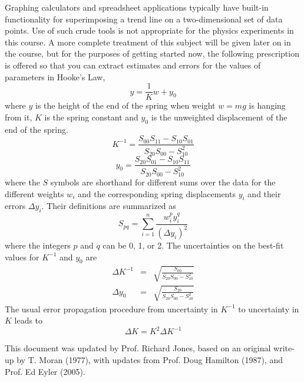 \documentclass{revtex4}
\begin{document}
Graphing calculators and spreadsheet applications typically have
built-in functionality for superimposing a trend line on a 
two-dimensional set of data points.  Use of such crude tools is not
appropriate for the physics experiments in this course.  A more complete
treatment of this subject will be given later on in the course, but for
the purposes of getting started now, the following prescription is offered
so that you can extract estimates and errors for the values of parameters
in Hooke's Law,
\begin{equation}
y = \frac{1}{K}w + y_0
\end{equation}
where $y$ is the height of the end of the spring when weight $w=mg$ is
hanging from it, $K$ is the spring constant and $y_0$ is the unweighted
displacement of the end of the spring.
\begin{equation}
K^{-1} = \frac{S_{00}S_{11}-S_{10}S_{01}}{S_{20}S_{00}-S_{10}^2}
\end{equation}
\begin{equation}
y_0 = \frac{S_{20}S_{01}-S_{10}S_{11}}{S_{20}S_{00}-S_{10}^2}
\end{equation}
where the $S$ symbols are shorthand for different sums over the data
for the different weights $w_i$ and the corresponding spring displacements
$y_i$ and their errors $\Delta y_i$.  Their definitions
are summarized as
\begin{equation}
S_{pq} = \sum_{i=1}^{n}\frac{w_i^py_i^q}{(\Delta y_i)^2}
\end{equation}
where the integers $p$ and $q$ can be 0, 1, or 2.
The uncertainties on the best-fit values for $K^{-1}$ and $y_0$ are 
\begin{eqnarray}
\Delta K^{-1} &=& \sqrt{\frac{S_{00}}{S_{20}S_{00}-S_{10}^2}} \\
\Delta y_0 &=& \sqrt{\frac{S_{20}}{S_{20}S_{00}-S_{10}^2}}
\end{eqnarray}
The usual error propagation procedure from uncertainty in $K^{-1}$ to
uncertainty in $K$ leads to
\begin{equation}
\Delta K = K^2\Delta K^{-1}
\end{equation}

\begin{acknowledgments}
This document was updated by Prof. Richard Jones, based on an original
write-up by T. Moran (1977), with updates from Prof. Doug Hamilton (1987),
and Prof. Ed Eyler (2005).
\end{acknowledgments}

%

\end{document}
